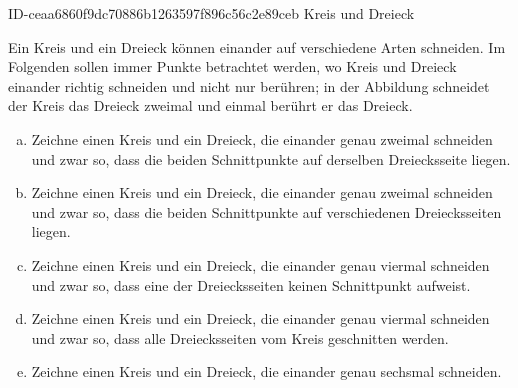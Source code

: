 \begin{exercise}
      {ID-ceaa6860f9dc70886b1263597f896c56c2e89ceb}
      {Kreis und Dreieck}
  \ifproblem\problem\par
    \begin{minipage}{0.75\textwidth}
      Ein Kreis und ein Dreieck können einander auf verschiedene Arten
      schneiden. Im Folgenden sollen immer Punkte betrachtet werden, wo Kreis
      und Dreieck einander richtig schneiden und nicht nur berühren; in der
      Abbildung schneidet der Kreis das Dreieck zweimal und einmal berührt
      er das Dreieck.
    \end{minipage}\hfill
    \begin{minipage}{0.24\textwidth}
      \centering
    \end{minipage}\par
    \begin{enumerate}[a)]
      \item Zeichne einen Kreis und ein Dreieck, die einander genau zweimal
            schneiden und zwar so, dass die beiden Schnittpunkte auf derselben
            Dreiecksseite liegen.
      \item Zeichne einen Kreis und ein Dreieck, die einander genau zweimal
            schneiden und zwar so, dass die beiden Schnittpunkte auf verschiedenen
            Dreiecksseiten liegen.
      \item Zeichne einen Kreis und ein Dreieck, die einander genau viermal
            schneiden und zwar so, dass eine der Dreiecksseiten keinen Schnittpunkt
            aufweist.
      \item Zeichne einen Kreis und ein Dreieck, die einander genau viermal
            schneiden und zwar so, dass alle Dreiecksseiten vom Kreis geschnitten
            werden.
      \item Zeichne einen Kreis und ein Dreieck, die einander genau sechsmal
            schneiden.
    \end{enumerate}
  \fi
\end{exercise}
